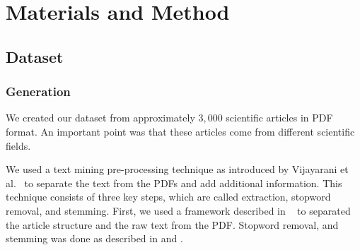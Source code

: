 \chapter{Materials and Method}
\label{cha:materials_and_method}

\section{Dataset}
\label{sec:dataset}

\subsection{Generation}
\label{subsec:generation}

We created our dataset from approximately $3,000$ scientific articles in PDF format. An important point was that these articles come from different scientific fields.

We used a text mining pre-processing technique as introduced by Vijayarani et al.~\cite{Vijayarani2015} to separate the text from the PDFs and add additional information. This technique consists of three key steps, which are called extraction, stopword removal, and stemming. First, we used a framework described in ~\cite{KlampflGJK14} to separated the article structure and the raw text from the PDF. Stopword removal, and stemming was done as described in  and .

